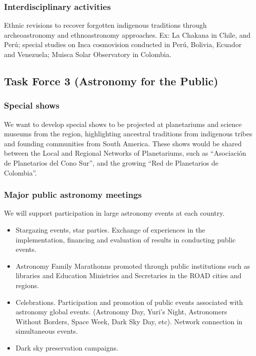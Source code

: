 \documentclass[12pt]{article}
\begin{document}
\subsubsection*{Interdisciplinary activities}
Ethnic revisions to recover forgotten indigenous traditions through
archeoastronomy and ethnoastronomy approaches. Ex: La Chakana in
Chile, and Perú; special studies on Inca cosmovision conducted in
Perú, Bolivia, Ecuador and Venezuela; Muisca Solar Observatory in
Colombia.  

\subsection{Task Force 3 (Astronomy for the Public)}


\subsubsection*{Special shows} 

We want to develop special shows to be projected at planetariums and
science museums from the region, highlighting ancestral traditions
from indigenous tribes and founding communities from South
America. These shows would be shared between the Local and Regional
Networks of Planetariums, such as “Asociación de Planetarios del Cono
Sur”, and the growing “Red de Planetarios de Colombia”.  

\subsubsection*{Major public astronomy meetings} 

We will support participation in large astronomy events at each
country. 

\begin{itemize}
\item Stargazing events, star parties. Exchange of experiences in
the implementation, financing and evaluation of results in conducting
public events. 
\item Astronomy Family Marathonns promoted through public institutions
  such as libraries and Education Ministries and Secretaries in the
  ROAD cities and regions. 

\item Celebrations. Participation and promotion of public events
  associated with astronomy global events. (Astronomy Day, Yuri's
  Night, Astronomers Without Borders, Space Week, Dark Sky Day,
  etc). Network connection in simultaneous events.  
\item Dark sky preservation campaigns.
\end{itemize}
\end{document}
